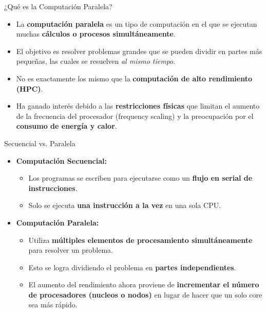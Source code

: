 \begin{frame}
  \titlepage
\end{frame}

\begin{frame}{¿Qué es la Computación Paralela?}
  \begin{itemize}
      \item La \textbf{computación paralela} es un tipo de computación en el que se ejecutan muchas \textbf{cálculos o procesos simultáneamente}.
      \item El objetivo es resolver problemas grandes que se pueden dividir en partes más pequeñas, las cuales se resuelven \emph{al mismo tiempo}.
      \item No es exactamente los mismo que la \textbf{computación de alto rendimiento (HPC)}.
    \item Ha ganado interés debido a las \textbf{restricciones físicas} que limitan el aumento de la frecuencia del procesador (frequency scaling) y la preocupación por el \textbf{consumo de energía y calor}.
  \end{itemize}
\end{frame}

\begin{frame}{Secuencial vs. Paralela}
  \begin{itemize}
    \item \textbf{Computación Secuencial:}
    \begin{itemize}
        \item Los programas se escriben para ejecutarse como un \textbf{flujo en serial de instrucciones}.
      \item Solo se ejecuta \textbf{una instrucción a la vez} en una sola CPU.
    \end{itemize}
    \item \textbf{Computación Paralela:}
    \begin{itemize}
      \item Utiliza \textbf{múltiples elementos de procesamiento simultáneamente} para resolver un problema.
      \item Esto se logra dividiendo el problema en \textbf{partes independientes}.
      \item El aumento del rendimiento ahora proviene de \textbf{incrementar el número de procesadores (nucleos o nodos)} en lugar de hacer que un solo core sea más rápido.
    \end{itemize}
  \end{itemize}
\end{frame}

